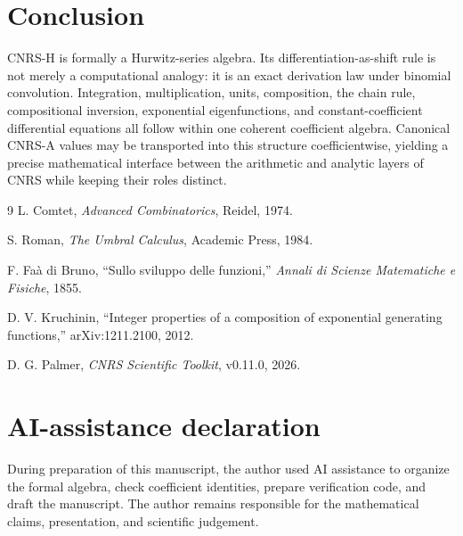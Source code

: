 \documentclass[11pt]{article}
\begin{document}
\section{Conclusion}

CNRS-H is formally a Hurwitz-series algebra.  Its differentiation-as-shift rule is not merely a computational analogy: it is an exact derivation law under binomial convolution.  Integration, multiplication, units, composition, the chain rule, compositional inversion, exponential eigenfunctions, and constant-coefficient differential equations all follow within one coherent coefficient algebra.  Canonical CNRS-A values may be transported into this structure coefficientwise, yielding a precise mathematical interface between the arithmetic and analytic layers of CNRS while keeping their roles distinct.

\begin{thebibliography}{9}
L. Comtet, \emph{Advanced Combinatorics}, Reidel, 1974.

S. Roman, \emph{The Umbral Calculus}, Academic Press, 1984.

F. Fa\`a di Bruno, ``Sullo sviluppo delle funzioni,'' \emph{Annali di Scienze Matematiche e Fisiche}, 1855.

D. V. Kruchinin, ``Integer properties of a composition of exponential generating functions,'' arXiv:1211.2100, 2012.

D. G. Palmer, \emph{CNRS Scientific Toolkit}, v0.11.0, 2026.
\end{thebibliography}

\section*{AI-assistance declaration}
During preparation of this manuscript, the author used AI assistance to organize the formal algebra, check coefficient identities, prepare verification code, and draft the manuscript.  The author remains responsible for the mathematical claims, presentation, and scientific judgement.
\end{document}
